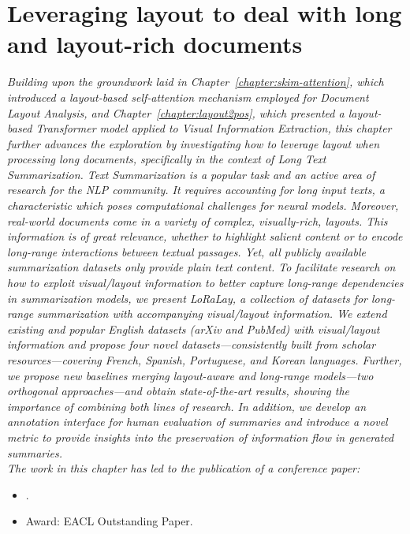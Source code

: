 
\chapter{Leveraging layout to deal with long and layout-rich documents}
\label{chapter:loralay}

\renewcommand{\leftmark}{\spacedlowsmallcaps{Leveraging layout to deal with long and layout-rich documents}}

\begin{chapabstract}
    {\em
    Building upon the groundwork laid in Chapter~\ref{chapter:skim-attention}, which introduced a layout-based self-attention mechanism employed for Document Layout Analysis, and Chapter~\ref{chapter:layout2pos}, which presented a layout-based Transformer model applied to Visual Information Extraction, this chapter further advances the exploration by investigating how to leverage layout when processing long documents, specifically in the context of Long Text Summarization.
    Text Summarization is a popular task and an active area of research for the \ac{NLP} community. It requires accounting for long input texts, a characteristic which poses computational challenges for neural models. 
    Moreover, real-world documents come in a variety of complex, visually-rich, layouts. This information is of great relevance, whether to highlight salient content or to encode long-range interactions between textual passages. Yet, all publicly available summarization datasets only provide plain text content.
    To facilitate research on how to exploit visual/layout information to better capture long-range dependencies in summarization models, we present \textit{LoRaLay}, a collection of datasets for long-range summarization with accompanying visual/layout information. We extend existing and popular English datasets (arXiv and PubMed) with visual/layout information and propose four novel datasets—consistently built from scholar resources—covering French, Spanish, Portuguese, and Korean languages.
    Further, we propose new baselines merging layout-aware and long-range models—two orthogonal approaches—and obtain state-of-the-art results, showing the importance of combining both lines of research. In addition, we develop an annotation interface for human evaluation of summaries and introduce a novel metric to provide insights into the preservation of information flow in generated summaries. \\
    \vspace*{5mm}
    The work in this chapter has led to the publication of a conference paper:}
    \begin{itemize}
        \item \small {}.
        \item \small Award: EACL Outstanding Paper.
    \end{itemize}
\end{chapabstract}

